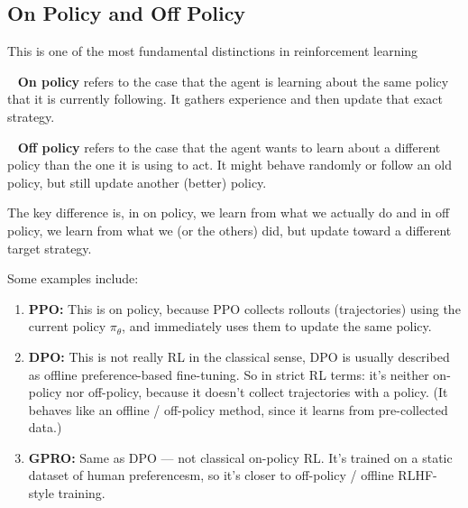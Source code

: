 \documentclass[11pt]{article}  %
\begin{document}
\subsection{On Policy and Off Policy}
This is one of the most fundamental distinctions in reinforcement learning

\textbullet~ \textbf{On policy} refers to the case that the agent is learning about the same policy that it is currently following. 
It gathers experience and then update that exact strategy.

\textbullet~ \textbf{Off policy} refers to the case that the agent wants to learn about a different policy than the one it is using to act. 
It might behave randomly or follow an old policy, but still update another (better) policy.

The key difference is, in on policy, we learn from what we actually do and in off policy, we learn from what we (or the others) did, but update toward a different target strategy.

Some examples include: 
\begin{enumerate}
  \item \textbf{PPO:} This is on policy, because PPO collects rollouts (trajectories) using the current policy $\pi_{\theta}$, and immediately uses them to update the same policy.
  \item \textbf{DPO:} This is not really RL in the classical sense, DPO is usually described as offline preference-based fine-tuning. 
  So in strict RL terms: it's neither on-policy nor off-policy, because it doesn't collect trajectories with a policy. (It behaves like an offline / off-policy method, since it learns from pre-collected data.)
  \item \textbf{GPRO:} Same as DPO — not classical on-policy RL. 
  It's trained on a static dataset of human preferencesm, so it's closer to off-policy / offline RLHF-style training.
\end{enumerate}
\end{document}
